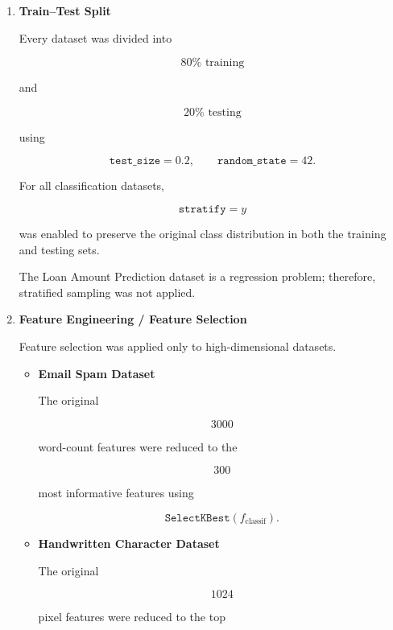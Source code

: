 \documentclass[12pt,a4paper]{article}
\begin{document}
\begin{enumerate}
This produces standardized features having

\[
\mu=0,\qquad
\sigma=1.
\]

Feature scaling was performed for every dataset before model training.

\vspace{0.3cm}

\item \textbf{Train--Test Split}

Every dataset was divided into

\[
80\% \text{ training}
\]

and

\[
20\% \text{ testing}
\]

using

\[
\texttt{test\_size}=0.2,
\qquad
\texttt{random\_state}=42.
\]

For all classification datasets,

\[
\texttt{stratify}=y
\]

was enabled to preserve the original class distribution in both the
training and testing sets.

The Loan Amount Prediction dataset is a regression problem; therefore,
stratified sampling was not applied.

\vspace{0.3cm}

\item \textbf{Feature Engineering / Feature Selection}

Feature selection was applied only to high-dimensional datasets.

\begin{itemize}

\item \textbf{Email Spam Dataset}

The original

\[
3000
\]

word-count features were reduced to the

\[
300
\]

most informative features using

\[
\texttt{SelectKBest}(f_{\text{classif}}).
\]

\vspace{0.2cm}

\item \textbf{Handwritten Character Dataset}

The original

\[
1024
\]

pixel features were reduced to the top


\end{itemize}
\end{enumerate}
\end{document}
